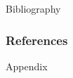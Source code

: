 \documentclass[xcolor=dvipsnames, english, 8pt]{beamer}
\begin{document}


        \begin{frame}
            \begin{center}
                {\Huge{{\color{ubRed}Bibliography}}}
            \end{center}
        \end{frame}

        \begin{frame}[allowframebreaks]
        \frametitle{References}
        
\end{frame}

\appendix
        \begin{frame}
            \begin{center}
                {\Huge{{\color{ubRed}Appendix}}}
            \end{center}
        \end{frame}
\end{document}
